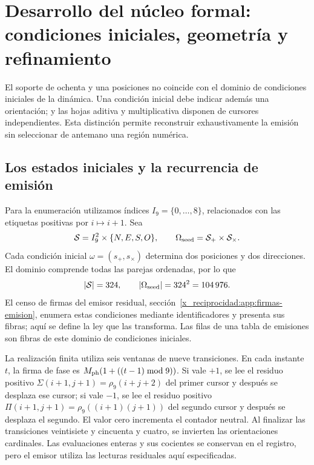 \section{Desarrollo del núcleo formal: condiciones iniciales, geometría y refinamiento}
\label{x_reciprocidad:sec:extension}

El soporte de ochenta y una posiciones no coincide con el dominio de condiciones iniciales de la dinámica. Una condición inicial debe indicar además una orientación; y las hojas aditiva y multiplicativa disponen de cursores independientes. Esta distinción permite reconstruir exhaustivamente la emisión sin seleccionar de antemano una región numérica.

\subsection{Los estados iniciales y la recurrencia de emisión}

Para la enumeración utilizamos índices \(I_9=\{0,\ldots,8\}\), relacionados con las etiquetas positivas por \(i\mapsto i+1\). Sea
\[
 \mathcal S=I_9^2\times\{N,E,S,O\},\qquad
 \Omega_{\rm seed}=\mathcal S_+\times\mathcal S_\times.
\]
Cada condición inicial \(\omega=(s_+,s_\times)\) determina dos posiciones y dos direcciones. El dominio comprende todas las parejas ordenadas, por lo que
\begin{equation}
 |\mathcal S|=324,\qquad |\Omega_{\rm seed}|=324^2=104\,976.
 \label{x_reciprocidad:eq:semillas}
\end{equation}
El censo de firmas del emisor residual, sección~\ref{x_reciprocidad:app:firmas-emision}, enumera estas condiciones mediante identificadores y presenta sus fibras; aquí se define la ley que las transforma. Las filas de una tabla de emisiones son fibras de este dominio de condiciones iniciales.

La realización finita utiliza seis ventanas de nueve transiciones. En cada instante \(t\), la firma de fase es \(M_{\rm ph}(1+((t-1)\bmod9))\). Si vale \(+1\), se lee el residuo positivo \(\Sigma(i+1,j+1)=\rho_9(i+j+2)\) del primer cursor y después se desplaza ese cursor; si vale \(-1\), se lee el residuo positivo \(\Pi(i+1,j+1)=\rho_9((i+1)(j+1))\) del segundo cursor y después se desplaza el segundo. El valor cero incrementa el contador neutral. Al finalizar las transiciones veintisiete y cincuenta y cuatro, se invierten las orientaciones cardinales. Las evaluaciones enteras y sus cocientes se conservan en el registro, pero el emisor utiliza las lecturas residuales aquí especificadas.

